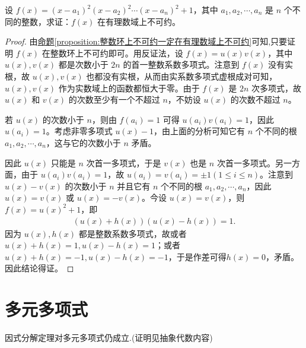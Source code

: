 \documentclass[lang=cn,newtx,10pt,scheme=chinese]{elegantbook}
\begin{document}
\begin{example}
设 $f(x) = (x - a_1)^2(x - a_2)^2 \cdots (x - a_n)^2 + 1$，其中 $a_1, a_2, \cdots, a_n$ 是 $n$ 个不同的整数，求证：$f(x)$ 在有理数域上不可约。
\end{example}
\begin{proof}
由\hyperref[proposition:整数环上不可约一定在有理数域上不可约]{命题\ref{proposition:整数环上不可约一定在有理数域上不可约}}可知,只要证明 $f(x)$ 在整数环上不可约即可。用反证法，设 $f(x) = u(x)v(x)$，其中 $u(x), v(x)$ 都是次数小于 $2n$ 的首一整数系数多项式。注意到 $f(x)$ 没有实根，故
$u(x), v(x)$
也都没有实根，从而由实系数多项式虚根成对可知，$u(x), v(x)$ 作为实数域上的函数都恒大于零。由于 $f(x)$ 是 $2n$ 次多项式，故 $u(x)$ 和 $v(x)$ 的次数至少有一个不超过 $n$，不妨设 $u(x)$ 的次数不超过 $n$。

若 $u(x)$ 的次数小于 $n$，则由 $f(a_i) = 1$ 可得 $u(a_i)v(a_i) = 1$，因此 $u(a_i) = 1$。考虑非零多项式 $u(x) - 1$，由上面的分析可知它有 $n$ 个不同的根 $a_1, a_2, \cdots, a_n$，这与它的次数小于 $n$ 矛盾。

因此 $u(x)$ 只能是 $n$ 次首一多项式，于是 $v(x)$ 也是 $n$ 次首一多项式。另一方面，由于 $u(a_i)v(a_i) = 1$，故 $u(a_i) = v(a_i) = \pm 1 (1 \leq i \leq n)$。注意到 $u(x) - v(x)$ 的次数小于 $n$ 并且它有 $n$ 个不同的根 $a_1, a_2, \cdots, a_n$，因此 $u(x) = v(x)$ 或 $u(x) = -v(x)$。今设 $u(x) = v(x)$，则 $f(x) = u(x)^2 + 1$，即
\begin{align*}
(u(x) + h(x))(u(x) - h(x)) = 1.
\end{align*}
因为 $u(x), h(x)$ 都是整数系数多项式，故或者 $u(x) + h(x) = 1, u(x) - h(x) = 1$；或者 $u(x) + h(x) = -1, u(x) - h(x) = -1$，于是作差可得$h(x) = 0$，矛盾。因此结论得证。
\end{proof}



\section{多元多项式}

因式分解定理对多元多项式仍成立.(证明见抽象代数内容)
\end{document}

